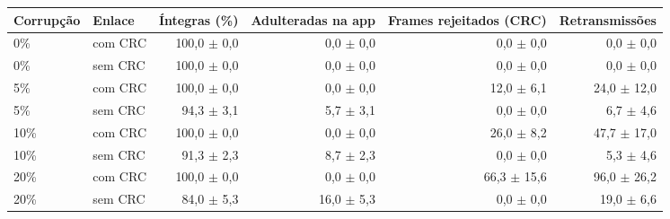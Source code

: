 \begin{tabular}{llrrrr}
\toprule
Corrup\c{c}\~ao & Enlace & \'Integras (\%) & Adulteradas na app & Frames rejeitados (CRC) & Retransmiss\~oes \\
\midrule
0\% & com CRC & 100,0 $\pm$ 0,0 & 0,0 $\pm$ 0,0 & 0,0 $\pm$ 0,0 & 0,0 $\pm$ 0,0 \\
0\% & sem CRC & 100,0 $\pm$ 0,0 & 0,0 $\pm$ 0,0 & 0,0 $\pm$ 0,0 & 0,0 $\pm$ 0,0 \\
5\% & com CRC & 100,0 $\pm$ 0,0 & 0,0 $\pm$ 0,0 & 12,0 $\pm$ 6,1 & 24,0 $\pm$ 12,0 \\
5\% & sem CRC & 94,3 $\pm$ 3,1 & 5,7 $\pm$ 3,1 & 0,0 $\pm$ 0,0 & 6,7 $\pm$ 4,6 \\
10\% & com CRC & 100,0 $\pm$ 0,0 & 0,0 $\pm$ 0,0 & 26,0 $\pm$ 8,2 & 47,7 $\pm$ 17,0 \\
10\% & sem CRC & 91,3 $\pm$ 2,3 & 8,7 $\pm$ 2,3 & 0,0 $\pm$ 0,0 & 5,3 $\pm$ 4,6 \\
20\% & com CRC & 100,0 $\pm$ 0,0 & 0,0 $\pm$ 0,0 & 66,3 $\pm$ 15,6 & 96,0 $\pm$ 26,2 \\
20\% & sem CRC & 84,0 $\pm$ 5,3 & 16,0 $\pm$ 5,3 & 0,0 $\pm$ 0,0 & 19,0 $\pm$ 6,6 \\
\bottomrule
\end{tabular}

